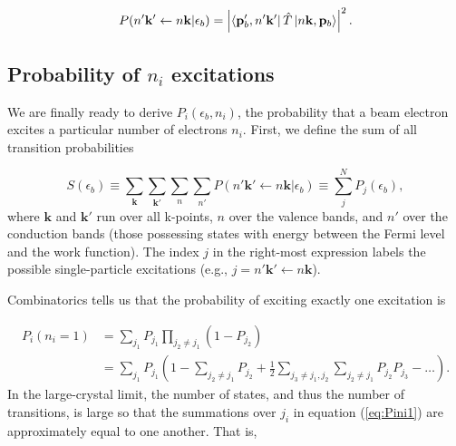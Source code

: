 \documentclass{article}
\begin{document}
\begin{equation}
  P(n'\mathbf{k'}\leftarrow n\mathbf{k}|\epsilon_b)
  =
  \left|
  \bra{\mathbf{p}_b', n'\mathbf{k'}} \hat{T} \ket{n\mathbf{k},\mathbf{p}_b}
  \right|^2.
  \label{eq:prob}
\end{equation}
%

\subsection{Probability of $n_i$ excitations}
\label{sec:Pi}

We are finally ready to derive $P_i(\epsilon_b, n_i)$, the probability that a
beam electron excites a particular number of electrons $n_i$.  First, we define
the sum of all transition probabilities

\begin{equation}
  S(\epsilon_b)
  \equiv
  \sum_\mathbf{k} \sum_\mathbf{k'} \sum_n \sum_{n'}
  P(n'\mathbf{k}'\leftarrow n\mathbf{k}|\epsilon_b)
  \equiv
  \sum_j^N P_j(\epsilon_b),
  \label{eq:S}
\end{equation}
%
where $\mathbf{k}$ and $\mathbf{k'}$ run over all k-points, $n$ over
the valence bands, and $n'$ over the conduction bands (those possessing states
with energy between the Fermi level and the work function).
The index $j$ in the right-most expression labels the possible single-particle
excitations (e.g., $j=n'\mathbf{k'}\leftarrow n\mathbf{k}$).

Combinatorics tells us that the probability of exciting exactly one excitation
is

\begin{equation}
  \begin{aligned}
    P_i(n_i=1)
    &=
    \sum_{j_1} P_{j_1}
    \prod_{j_2\neq j_1} (1 - P_{j_2})
    \\&=
    \sum_{j_1} P_{j_1}
    \left(
      1 - \sum_{j_2\neq j_1} P_{j_2}
      + \frac{1}{2} \sum_{j_3\neq j_1,j_2} \sum_{j_2\neq j_1} P_{j_2} P_{j_3}
      - \dots
    \right).
  \label{eq:Pini1}
  \end{aligned}
\end{equation}
%
In the large-crystal limit, the number of states, and thus the number of
transitions, is large so that the summations over $j_i$ in equation
(\ref{eq:Pini1}) are approximately equal to one another.
That is,
\end{document}
